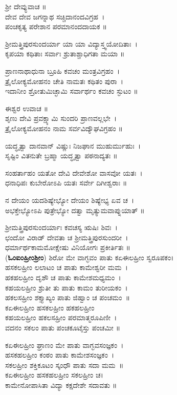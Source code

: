 ಶ್ರೀ ದೇವ್ಯುವಾಚ ॥\\
ದೇವ ದೇವ ಜಗನ್ನಾಥ ಸಚ್ಚಿದಾನಂದವಿಗ್ರಹ~।\\
ಪಂಚಕೃತ್ಯ ಪರೇಶಾನ ಪರಮಾನಂದದಾಯಕ ॥

ಶ್ರೀಮತ್ತ್ರಿಪುರಸುಂದರ್ಯಾ ಯಾ ಯಾ ವಿದ್ಯಾಸ್ತ್ವಯೋದಿತಾಃ~।\\
ಕೃಪಯಾ ಕಥಿತಾಃ ಸರ್ವಾಃ ಶ್ರುತಾಶ್ಚಾಧಿಗತಾ ಮಯಾ ॥

ಪ್ರಾಣನಾಥಾಧುನಾ ಬ್ರೂಹಿ ಕವಚಂ ಮಂತ್ರವಿಗ್ರಹಂ~।\\
ತ್ರೈಲೋಕ್ಯಮೋಹನಂ ಚೇತಿ ನಾಮತಃ ಕಥಿತಂ ಪುರಾ~।\\
ಇದಾನೀಂ ಶ್ರೋತುಮಿಚ್ಛಾಮಿ ಸರ್ವಾರ್ಥಂ ಕವಚಂ ಸ್ಫುಟಂ ॥

ಈಶ್ವರ ಉವಾಚ ॥\\
ಶೃಣು ದೇವಿ ಪ್ರವಕ್ಷ್ಯಾಮಿ ಸುಂದರಿ ಪ್ರಾಣವಲ್ಲಭೇ~।\\
ತ್ರೈಲೋಕ್ಯಮೋಹನಂ ನಾಮ ಸರ್ವವಿದ್ಯೌಘವಿಗ್ರಹಂ ॥

ಯದ್ಧೃತ್ವಾ ದಾನವಾನ್ ವಿಷ್ಣುಃ ನಿಜಘಾನ ಮುಹುರ್ಮುಹುಃ~।\\
ಸೃಷ್ಟಿಂ ವಿತನುತೇ ಬ್ರಹ್ಮಾ ಯದ್ಧೃತ್ವಾ ಪಠನಾದ್ಯತಃ ॥

ಸಂಹರ್ತಾಹಂ ಯತೋ ದೇವಿ ದೇವೇಶೋ ವಾಸವೋ ಯತಃ~।\\
ಧನಾಧಿಪಃ ಕುಬೇರೋಽಪಿ ಯತಃ ಸರ್ವೇ ದಿಗೀಶ್ವರಾಃ ॥

ನ ದೇಯಂ ಯದಶಿಷ್ಯೇಭ್ಯೋ ದೇಯಂ ಶಿಷ್ಯೇಭ್ಯ ಏವ ಚ~।\\
ಅಭಕ್ತೇಭ್ಯೋಽಪಿ ಪುತ್ರೇಭ್ಯೋ ದತ್ವಾ ಮೃತ್ಯುಮವಾಪ್ನುಯಾತ್ ॥

ಶ್ರೀಮತ್ತ್ರಿಪುರಸುಂದರ್ಯಾಃ ಕವಚಸ್ಯ ಋಷಿಃ ಶಿವಃ~।\\
ಛಂದೋ ವಿರಾಡ್ ದೇವತಾ ಚ ಶ್ರೀಮತ್ತ್ರಿಪುರಸುಂದರೀ~।\\
ಧರ್ಮಾರ್ಥಕಾಮಮೋಕ್ಷೇಷು ವಿನಿಯೋಗಃ ಪ್ರಕೀರ್ತಿತಃ ॥\\
\newpage
({\bfseries ಓಂಐಂಹ್ರೀಂಶ್ರೀಂ}) ಶಿರೋ ಮೇ ವಾಗ್ಭವಂ ಪಾತು ಕಏಈಲಹ್ರೀಂ ಸ್ವರೂಪಕಂ।\\
ಹಸಕಲಹ್ರೀಂ ಲಲಾಟಂ ಚ ಪಾತು ಕಾಮೇಶ್ವರೀ ಮಮ~।\\
ಹಕಹಲಹ್ರೀಂ ದೃಶೌ ಚ ಪಾತು ಕಾಮೇಶಮಧ್ಯಮಂ~।\\
ಕಹಯಲಹ್ರೀಂ ಶ್ರುತೀ ತು ಪಾತು ಕಾಮಂ ತುರೀಯಕಂ~।\\
ಹಕಲಸಹ್ರೀಂ ಶಕ್ತ್ಯಾಖ್ಯಂ ಪಾತು ಜಿಹ್ವಾಂ ಚ ಪಂಚಮಂ~॥\\
ಕಏಈಲಹ್ರೀಂ ಹಸಕಲಹ್ರೀಂ ಹಕಹಲಹ್ರೀಂ\\
ಕಹಯಲಹ್ರೀಂ ಹಕಲಸಹ್ರೀಂ  ಪರಮಾತ್ಮರೂಪಿಣೀ~।\\
ವದನಂ ಸಕಲಂ ಪಾತು ಪಂಚಕೂಟೈಸ್ತು ಪಂಚಮೀ ॥

ಕಏಈಲಹ್ರೀಂ ಘ್ರಾಣಂ ಮೇ ಪಾತು ವಾಗ್ಭವಸಂಜ್ಞಕಂ~।\\
ಹಸಕಹಲಹ್ರೀಂ ಕಂಠಂ ಪಾತು ಕಾಮೇಶಸಂಜ್ಞಕಂ~।\\
ಸಕಲಹ್ರೀಂ ಶಕ್ತಿಕೂಟಂ ಸ್ಕಂಧೌ ಪಾತು ಸದಾ ಮಮ~॥\\
ಕಏಈಲಹ್ರೀಂ ಹಸಕಹಲಹ್ರೀಂ ಸಕಲಹ್ರೀಂ ಚ।\\
ಕಾಮೇನೋಪಾಸಿತಾ ವಿದ್ಯಾ ಕಕ್ಷದೇಶೇ ಸದಾವತು ॥

